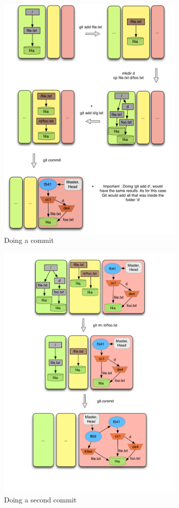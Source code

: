 \begin{figure}[!t]
   \centering
   \includegraphics[width=0.8\textwidth]{images/commit1.png}
   \caption{Doing a commit}\label{fig:commit1}
\end{figure}
\begin{figure}[!t]
   \centering
   \includegraphics[width=0.8\textwidth]{images/commit2.png}
   \caption{Doing a second commit}\label{fig:commit2}
\end{figure}

